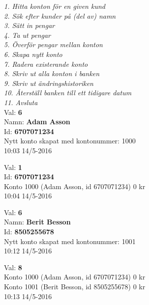 \begin{multicols}{2}
\noindent
\begin{exampleblock}
\textit{
1.   Hitta konton för en given kund\\
2.   Sök efter kunder på (del av) namn\\
3.   Sätt in pengar\\
4.   Ta ut pengar\\
5.   Överför pengar mellan konton\\
6.   Skapa nytt konto\\
7.   Radera existerande konto\\
8.   Skriv ut alla konton i banken\\
9.   Skriv ut ändringshistoriken\\
10.  Återställ banken till ett tidigare datum\\
11.  Avsluta\\
}
Val: \textbf{6}\\
Namn: \textbf{Adam Asson}\\
Id: \textbf{6707071234}\\
Nytt konto skapat med kontonummer: 1000\\
10:03 14/5-2016\\
\end{exampleblock}
\begin{exampleblock}
Val: \textbf{1}\\
Id: \textbf{6707071234}\\
Konto 1000 (Adam Asson, id 6707071234) 0 kr\\
10:04 14/5-2016\\
\end{exampleblock}
\begin{exampleblock}
Val: \textbf{6}\\
Namn: \textbf{Berit Besson}\\
Id: \textbf{8505255678}\\
Nytt konto skapat med kontonummer: 1001\\
10:12 14/5-2016\\
\end{exampleblock}
\begin{exampleblock}
Val: \textbf{8}\\
Konto 1000 (Adam Asson, id 6707071234) 0 kr\\
Konto 1001 (Berit Besson, id 8505255678) 0 kr\\
10:13 14/5-2016\\
\end{exampleblock}
\begin{exampleblock}

\end{exampleblock}
\end{multicols}
